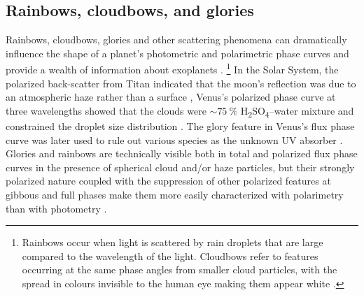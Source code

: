\documentclass[usenatbib]{mnras}
\begin{document}
\subsection{Rainbows, cloudbows, and glories}

Rainbows, cloudbows, glories and other scattering phenomena can dramatically influence the shape of a planet's photometric and polarimetric phase curves and provide a wealth of information about exoplanets \citep{karalidi2012rainbow, stam2008,bailey2007,2014A&A...566L...1G}.%
\footnote{
    Rainbows occur when light is scattered by rain droplets that are large compared to the wavelength of the light. 
    Cloudbows refer to features occurring at the same phase angles from smaller cloud particles, with the spread in colours invisible to the human eye making them appear white \citep[for further discussion, see][]{bailey2007}.  
}
%
In the Solar System, the polarized back-scatter from Titan indicated that the moon's reflection was due to an atmospheric haze rather than a surface \citep{zellner1973polarization}, Venus's polarized phase curve at three wavelengths showed that the clouds were $\sim\qty{75}{\percent}$ H\textsubscript{2}SO\textsubscript{4}--water mixture and constrained the droplet size distribution \citep{hansenhovenier1974}.
%
The glory feature in Venus's flux phase curve was later used to rule out various species as the unknown UV absorber \citep{petrova2018glory}.
%
Glories and rainbows are technically visible both in total and polarized flux phase curves in the presence of spherical cloud and/or haze particles, but their strongly polarized nature coupled with the suppression of other polarized features at gibbous and full phases make them more easily characterized with polarimetry than with photometry \citep{karalidi2011, stam2008, treesandstam2019,trees2022}.
%

\end{document}
